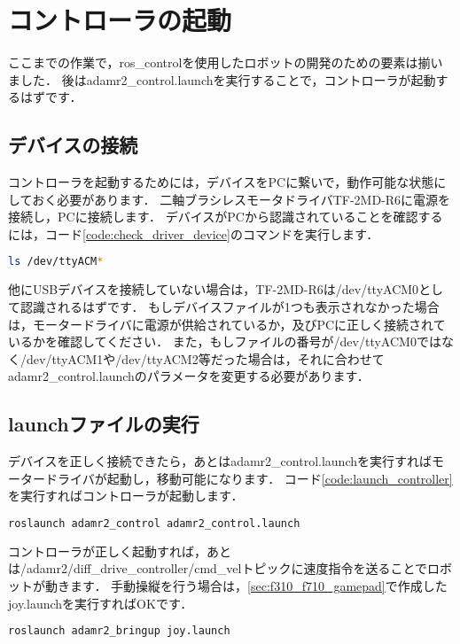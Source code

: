 \documentclass[{../../master}]{subfiles}
\begin{document}
\section{コントローラの起動}

ここまでの作業で，\textsf{ros\_control}を使用したロボットの開発のための要素は揃いました．
後は\textsf{adamr2\_control.launch}を実行することで，コントローラが起動するはずです．

\subsection{デバイスの接続}

コントローラを起動するためには，デバイスをPCに繋いで，動作可能な状態にしておく必要があります．
二軸ブラシレスモータドライバTF-2MD-R6に電源を接続し，PCに接続します．
デバイスがPCから認識されていることを確認するには，コード\ref{code:check_driver_device}のコマンドを実行します．

\begin{lstlisting}[language=sh, label=code:check_driver_device, caption=Cheking Motor Driver Device]
ls /dev/ttyACM*
\end{lstlisting}

他にUSBデバイスを接続していない場合は，TF-2MD-R6は\textsf{/dev/ttyACM0}として認識されるはずです．
もしデバイスファイルが1つも表示されなかった場合は，モータードライバに電源が供給されているか，及びPCに正しく接続されているかを確認してください．
また，もしファイルの番号が\textsf{/dev/ttyACM0}ではなく\textsf{/dev/ttyACM1}や\textsf{/dev/ttyACM2}等だった場合は，それに合わせて\textsf{adamr2\_control.launch}のパラメータを変更する必要があります．

\subsection{launchファイルの実行}

デバイスを正しく接続できたら，あとは\textsf{adamr2\_control.launch}を実行すればモータードライバが起動し，移動可能になります．
コード\ref{code:launch_controller}を実行すればコントローラが起動します．

\begin{lstlisting}[language=sh, label=code:launch_controller, caption=launch \textsf{adamr2\_control.launch}]
roslaunch adamr2_control adamr2_control.launch
\end{lstlisting}

コントローラが正しく起動すれば，あとは\textsf{/adamr2/diff\_drive\_controller/cmd\_vel}トピックに速度指令を送ることでロボットが動きます．
手動操縦を行う場合は，\ref{sec:f310_f710_gamepad}で作成した\textsf{joy.launch}を実行すればOKです．

\begin{lstlisting}[language=sh, label=code:launch_joy, caption=launch \textsf{joy.launch}]
roslaunch adamr2_bringup joy.launch
\end{lstlisting}
\end{document}
